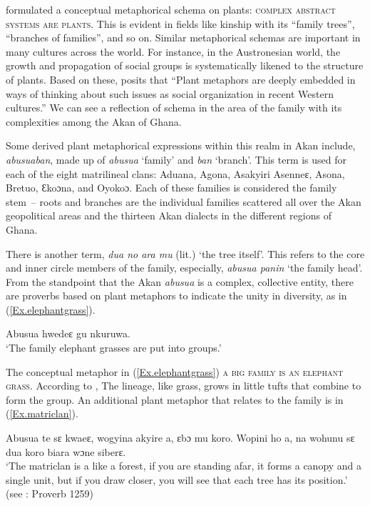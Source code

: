 \documentclass[output=paper,colorlinks,citecolor=brown]{langscibook}
\begin{document}
\citet[98]{Kövecses2002} formulated a conceptual metaphorical schema on plants: \textsc{complex abstract systems are plants}. This is evident in fields like kinship with its “family trees”, “branches of families”, and so on. Similar metaphorical schemas are important in many cultures across the world. For instance, in the Austronesian world, the growth and propagation of social groups is systematically likened to the structure of plants. Based on these, \citet[218]{Schecter2015} posits that ``Plant metaphors are deeply embedded in ways of thinking about such issues as social organization in recent Western cultures.'' We can see a reflection of \citet{Kövecses2002} schema in the area of the family with its complexities among the Akan of Ghana.

Some derived plant metaphorical expressions within this realm in Akan include, \textit{abusuaban}, made up of \textit{abusua} `family’ and \textit{ban} `branch’. This term is used for each of the eight matrilineal clans: Aduana, Agona, Asakyiri Asenneɛ, Asona, Bretuo, Ɛkoɔna, and Oyokoɔ. Each of these families is considered the family stem~– roots and branches are the individual families scattered all over the Akan geopolitical areas and the thirteen Akan dialects in the different regions of Ghana. 

There is another term, \textit{dua no ara mu} (lit.) `the tree itself’. This refers to the core and inner circle members of the family, especially, \textit{abusua panin} ‘the family head'. From the standpoint that the Akan \textit{abusua} is a complex, collective entity, there are proverbs based on plant metaphors to indicate the unity in diversity, as in (\ref{Ex.elephantgrass}).

\ea \label{Ex.elephantgrass}
\gl Abusua 	hwedeɛ 	gu 	nkuruwa.\\
\glt  ‘The family elephant grasses	are put	 into groups.'
\z

The conceptual metaphor in (\ref{Ex.elephantgrass}) \textsc{a big family is an elephant grass}. According to \citet[20]{Nketia1955}, The lineage, like grass, grows in little tufts that combine to form the group. An additional plant metaphor that relates to the family is in (\ref{Ex.matriclan}). 

\ea \label{Ex.matriclan}
\gl Abusua te sɛ kwaeɛ, wogyina akyire a, ɛbɔ mu koro. Wopini ho a, na wohunu sɛ dua koro biara wɔne siberɛ.\\
\glt  ‘The matriclan is a like a forest, if you are standing afar, it forms a canopy and a single unit, but if you draw closer, you will see that each tree has its position.’ (see \cite{Appiahetal2000}: Proverb 1259)
\z
\end{document}
